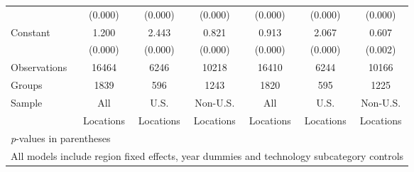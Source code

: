 \begin{table}[htbp]
\begin{tabular}{l*{6}{c}}
                &  (0.000)&  (0.000)&  (0.000)&  (0.000)&  (0.000)&  (0.000)\\
Constant        &    1.200&    2.443&    0.821&    0.913&    2.067&    0.607\\
                &  (0.000)&  (0.000)&  (0.000)&  (0.000)&  (0.000)&  (0.002)\\
\hline
Observations    &    16464&     6246&    10218&    16410&     6244&    10166\\
Groups          &     1839&      596&     1243&     1820&      595&     1225\\
Sample&All &U.S. &Non-U.S.&All &U.S. &Non-U.S. \\
          &Locations &Locations&Locations&Locations &Locations&Locations \\\hline\hline
\multicolumn{7}{l}{\footnotesize \textit{p}-values in parentheses}\\
\multicolumn{7}{l}{\footnotesize All models include region fixed effects, year dummies and technology subcategory controls}\\
\end{tabular}
\end{table}
